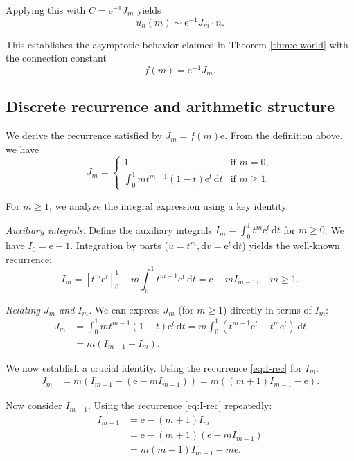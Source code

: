 \documentclass[11pt,reqno]{amsart}
\theoremstyle{definition}
\newcommand{\dd}{\mathrm{d}}
\newcommand{\ee}{\mathrm{e}}
\numberwithin{equation}{section}
\begin{document}
Applying this with $C = \ee^{-1}J_m$ yields
$$u_n(m) \sim \ee^{-1}J_m \cdot n.$$

This establishes the asymptotic behavior claimed in Theorem \ref{thm:e-world} with the connection constant
\begin{equation}\label{eq:f-def}
f(m) = \ee^{-1}J_m.
\end{equation}

\subsection{Discrete recurrence and arithmetic structure}

We derive the recurrence satisfied by $J_m = f(m)\ee$. From the definition above, we have
\begin{equation}\label{eq:J-def}
J_m = \begin{cases}
1 & \text{if } m=0,\\
\displaystyle\int_0^1 mt^{m-1}(1-t)\ee^t\, \dd t & \text{if } m \geq 1.
\end{cases}
\end{equation}

For $m \geq 1$, we analyze the integral expression using a key identity.

\textit{Auxiliary integrals.} Define the auxiliary integrals $I_m = \int_0^1 t^m\ee^t\, \dd t$ for $m \geq 0$. We have $I_0 = \ee-1$. Integration by parts ($u=t^m, \dd v=\ee^t\, \dd t$) yields the well-known recurrence:
\begin{equation}\label{eq:I-rec}
I_m = [t^m\ee^t]_0^1 - m\int_0^1 t^{m-1}\ee^t\, \dd t = \ee - mI_{m-1}, \quad m \geq 1.
\end{equation}

\textit{Relating $J_m$ and $I_m$.} We can express $J_m$ (for $m \geq 1$) directly in terms of $I_m$:
\begin{align*}
J_m &= \int_0^1 mt^{m-1}(1-t)\ee^t\, \dd t = m\int_0^1 (t^{m-1}\ee^t - t^m\ee^t)\, \dd t \\
&= m(I_{m-1} - I_m).
\end{align*}

We now establish a crucial identity. Using the recurrence \eqref{eq:I-rec} for $I_m$:
\begin{align*}
J_m &= m(I_{m-1} - (\ee - mI_{m-1})) = m((m+1)I_{m-1} - \ee).
\end{align*}

Now consider $I_{m+1}$. Using the recurrence \eqref{eq:I-rec} repeatedly:
\begin{align*}
I_{m+1} &= \ee - (m+1)I_m \\
&= \ee - (m+1)(\ee - mI_{m-1}) \\
&= m(m+1)I_{m-1} - m\ee.
\end{align*}
\end{document}
